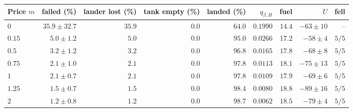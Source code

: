 \begin{tabular}{lrrrrrrrr}
\toprule
Price $m$ & failed (\%) & lander lost (\%) & tank empty (\%) & landed (\%) & $q_{\beta,H}$ & fuel & $U$ & fell \\
\midrule
$0$ & $35.9\pm32.7$ & $35.9$ & $0.0$ & $64.0$ & $0.1990$ & $14.4$ & $-63\pm10$ & -- \\
$0.15$ & $5.0\pm1.2$ & $5.0$ & $0.0$ & $95.0$ & $0.0266$ & $17.2$ & $-58\pm4$ & $5/5$ \\
$0.5$ & $3.2\pm1.2$ & $3.2$ & $0.0$ & $96.8$ & $0.0165$ & $17.8$ & $-68\pm8$ & $5/5$ \\
$0.75$ & $2.1\pm1.0$ & $2.1$ & $0.0$ & $97.8$ & $0.0113$ & $18.1$ & $-75\pm13$ & $5/5$ \\
$1$ & $2.1\pm0.7$ & $2.1$ & $0.0$ & $97.8$ & $0.0109$ & $17.9$ & $-69\pm6$ & $5/5$ \\
$1.25$ & $1.5\pm0.7$ & $1.5$ & $0.0$ & $98.4$ & $0.0080$ & $18.8$ & $-89\pm16$ & $5/5$ \\
$2$ & $1.2\pm0.8$ & $1.2$ & $0.0$ & $98.7$ & $0.0062$ & $18.5$ & $-79\pm4$ & $5/5$ \\
\bottomrule
\end{tabular}
